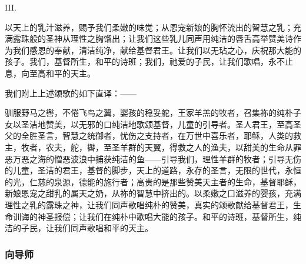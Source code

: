 III.\par

以天上的乳汁滋养，\newline{}赐予我们柔嫩的味觉；\newline{}从恩宠新娘的胸怀\newline{}流出的智慧之乳；\newline{}充满露珠般的圣神\newline{}从理性之胸馏出；\newline{}让我们这些乳儿同声\newline{}用纯洁的唇舌高举赞美诗\newline{}作为我们感恩的奉献，\newline{}清洁纯净，献给基督君王。\newline{}让我们以无玷之心，\newline{}庆祝那大能的孩子。\newline{}我们，基督所生，和平的诗班；\newline{}我们，祂爱的子民，\newline{}让我们歌唱，永不止息，\newline{}向至高和平的天主。\par

我们附上上述颂歌的如下直译：——\par

驯服野马之辔，不倦飞鸟之翼，婴孩的稳妥舵，王家羊羔的牧者，召集祢的纯朴子女以圣洁地赞美，以无邪的口纯洁地歌颂基督，儿童的引导者。圣人君王，至高圣父的全胜圣言，智慧之统御者，忧伤之支持者，在万世中喜乐者，耶稣，人类的救主，牧者，农夫，舵，辔，至圣羊群的天翼，得救之人的渔夫，以甜美的生命从罪恶万恶之海的憎恶波浪中捕获纯洁的鱼——引导我们，理性羊群的牧者；引导无伤的儿童，圣洁的君王，基督的脚步，天上的道路，永存的圣言，无限的世代，永恒的光，仁慈的泉源，德能的施行者；高贵的是那些赞美天主者的生命，基督耶稣，新娘恩宠之甜乳的属天之奶，从祢的智慧中挤出的。以柔嫩之口滋养的婴孩，充满理性之乳的露珠之神，让我们同声歌唱纯朴的赞美，真实的颂歌献给基督君王，生命训诲的神圣报偿；让我们在纯朴中歌唱大能的孩子。和平的诗班，基督所生，纯洁的子民，让我们同声歌唱和平的天主。\par


\subsubsection{向导师}

